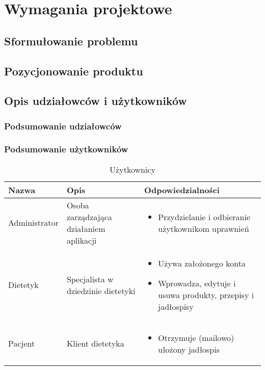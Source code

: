\chapter{Wymagania projektowe}
\section{Sformułowanie problemu}
\section{Pozycjonowanie produktu}
\section{Opis udziałowców i użytkowników}
\subsection{Podsumowanie udziałowców}
\subsection{Podsumowanie użytkowników}

\begin{table}[H]
    \centering\caption{Użytkownicy \label{tabela:uzytkownicy}}
    \begin{tabular}{|p{}|p{}|p{}|}

        \hline
        Nazwa & Opis & Odpowiedzialności\\

        \hline
        Administrator &
        Osoba zarządzająca działaniem aplikacji &
        \begin{itemize}
            \item Przydzielanie i odbieranie użytkownikom uprawnień
        \end{itemize} \\
        \hline
        Dietetyk &
        Specjalista w dziedzinie dietetyki &
        \begin{itemize}
            \item Używa założonego konta
            \item Wprowadza, edytuje i usuwa produkty, przepisy i jadłospisy
        \end{itemize} \\
        \hline
        Pacjent &
        Klient dietetyka &
        \begin{itemize}
            \item Otrzymuje (mailowo) ułożony jadłospis
        \end{itemize} \\
        \hline
    \end{tabular}
\end{table}

